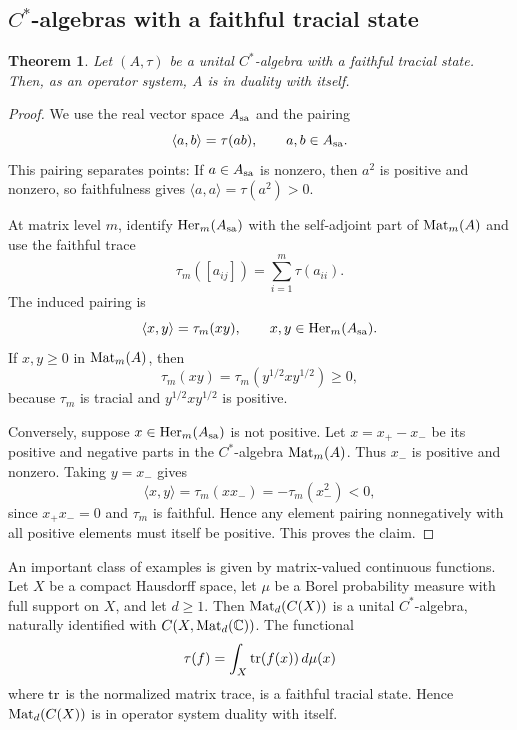 \documentclass[11pt,onecolumn]{article}
\theoremstyle{plain}
\newtheorem{theorem}{Theorem}[section]
\theoremstyle{definition}
\begin{document}
\subsection{\texorpdfstring{$C^*$-algebras}{C*-algebras} with a faithful tracial state}

\begin{theorem}
\label{thm:trace}
    Let $(A,\tau)$ be a unital $C^*$-algebra with a faithful tracial state. Then, as an operator system, $A$ is in duality with itself.
\end{theorem}
\begin{proof}
    We use the real vector space $A_{\rm sa}$ and the pairing
    \[
        \langle a,b\rangle=\tau(ab),
        \qquad a,b\in A_{\rm sa}.
    \]
    This pairing separates points: If $a\in A_{\rm sa}$ is nonzero, then
    $a^2$ is positive and nonzero, so faithfulness gives
    $\langle a,a\rangle=\tau(a^2)>0$.

    At matrix level $m$, identify ${\rm Her}_m(A_{\rm sa})$ with the
    self-adjoint part of ${\rm Mat}_m(A)$ and use the faithful trace
    \[
        \tau_m([a_{ij}])=\sum_{i=1}^m \tau(a_{ii}).
    \]
    The induced pairing is
    \[
        \langle x,y\rangle=\tau_m(xy),
        \qquad x,y\in {\rm Her}_m(A_{\rm sa}).
    \]
    If $x,y\geqslant 0$ in ${\rm Mat}_m(A)$, then
    \[
        \tau_m(xy)=\tau_m(y^{1/2}xy^{1/2})\geqslant 0,
    \]
    because $\tau_m$ is tracial and $y^{1/2}xy^{1/2}$ is positive.

    Conversely, suppose $x\in {\rm Her}_m(A_{\rm sa})$ is not positive.  Let
    $x=x_+-x_-$ be its positive and negative parts in the $C^*$-algebra
    ${\rm Mat}_m(A)$.  Thus $x_-$ is positive and nonzero.  Taking $y=x_-$ gives
    \[
        \langle x,y\rangle
        =\tau_m(xx_-)
        =-\tau_m(x_-^2)<0,
    \]
    since $x_+x_-=0$ and $\tau_m$ is faithful.  Hence any element pairing
    nonnegatively with all positive elements must itself be positive. This proves the claim.
\end{proof}

An important class of examples is given by matrix-valued continuous
functions.  Let $X$ be a compact Hausdorff space, let $\mu$ be a Borel probability measure with full support on $X$, and let $d\geqslant 1$.  Then
${\rm Mat}_d(C(X))$ is a unital $C^*$-algebra, naturally identified with
$C(X,{\rm Mat}_d(\mathbb C))$.  The functional
\[
    \tau(f)=\int_X {\rm tr}(f(x))\,d\mu(x)
\]
where ${\rm tr}$ is the normalized matrix trace, is a faithful tracial
state.  Hence ${\rm Mat}_d(C(X))$ is in operator system duality with itself.
\end{document}
